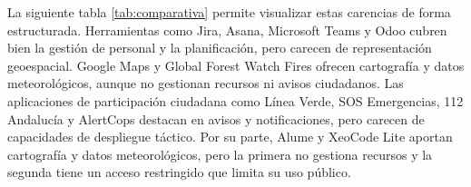 La siguiente tabla \ref{tab:comparativa} permite visualizar estas carencias de forma estructurada. Herramientas como Jira, Asana, Microsoft Teams y Odoo cubren bien la gestión de personal y la planificación, pero carecen de representación geoespacial. Google Maps y Global Forest Watch Fires ofrecen cartografía y datos meteorológicos, aunque no gestionan recursos ni avisos ciudadanos. Las aplicaciones de participación ciudadana como Línea Verde, SOS Emergencias, 112 Andalucía y AlertCops destacan en avisos y notificaciones, pero carecen de capacidades de despliegue táctico. Por su parte, Alume y XeoCode Lite aportan cartografía y datos meteorológicos, pero la primera no gestiona recursos y la segunda tiene un acceso restringido que limita su uso público. 

\begin{table}[H]
  \centering
\end{table}
